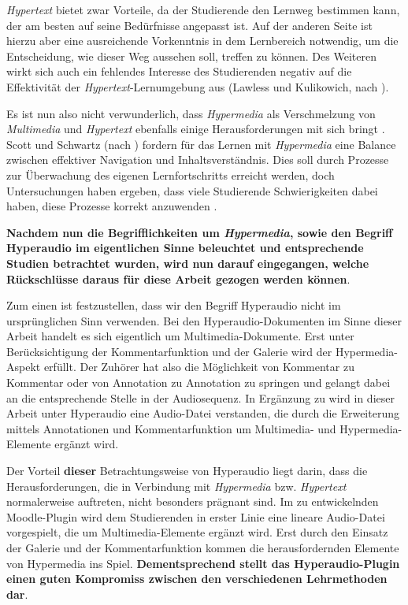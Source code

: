 \textit{Hypertext} bietet zwar Vorteile, da der Studierende den Lernweg bestimmen kann, der am besten auf seine Bedürfnisse angepasst ist. Auf der anderen Seite ist hierzu aber eine ausreichende Vorkenntnis in dem Lernbereich notwendig, um die Entscheidung, wie dieser Weg aussehen soll, treffen zu können. Des Weiteren wirkt sich auch ein fehlendes Interesse des Studierenden negativ auf die Effektivität der \textit{Hypertext}-Lernumgebung aus (Lawless und Kulikowich, nach \cite{moos2010multimedia}).

Es ist nun also nicht verwunderlich, dass \textit{Hypermedia} als Verschmelzung von \textit{Multimedia} und \textit{Hypertext} ebenfalls einige Herausforderungen mit sich bringt \citep{moos2010multimedia}. Scott und Schwartz (nach \cite{moos2010multimedia}) fordern für das Lernen mit \textit{Hypermedia} eine Balance zwischen effektiver Navigation und Inhaltsverständnis. Dies soll durch Prozesse zur Überwachung des eigenen Lernfortschritts erreicht werden, doch Untersuchungen haben ergeben, dass viele Studierende Schwierigkeiten dabei haben, diese Prozesse korrekt anzuwenden \citep{moos2010multimedia}.

\label{sec:audiocues}

\textbf{Nachdem nun die Begrifflichkeiten um \textit{Hypermedia}, sowie den Begriff Hyperaudio im eigentlichen Sinne beleuchtet und entsprechende Studien betrachtet wurden, wird nun darauf eingegangen, welche Rückschlüsse daraus für diese Arbeit gezogen werden können}.

Zum einen ist festzustellen, dass wir den Begriff Hyperaudio nicht im ursprünglichen Sinn verwenden. Bei den Hyperaudio-Dokumenten im Sinne dieser Arbeit handelt es sich eigentlich um Multimedia-Dokumente. Erst unter Berücksichtigung der Kommentarfunktion und der Galerie wird der Hypermedia-Aspekt erfüllt. Der Zuhörer hat also die Möglichkeit von Kommentar zu Kommentar oder von Annotation zu Annotation zu springen und gelangt dabei an die entsprechende Stelle in der Audiosequenz. In Ergänzung zu \cite{zumbach2006learning} wird in dieser Arbeit unter Hyperaudio eine Audio-Datei verstanden, die durch die Erweiterung mittels Annotationen und Kommentarfunktion um Multimedia- und Hypermedia-Elemente ergänzt wird.

Der Vorteil \textbf{dieser} Betrachtungsweise von Hyperaudio liegt darin, dass die Herausforderungen, die in Verbindung mit \textit{Hypermedia} bzw. \textit{Hypertext} normalerweise auftreten, nicht besonders prägnant sind. Im zu entwickelnden Moodle-Plugin wird dem Studierenden in erster Linie eine lineare Audio-Datei vorgespielt, die um Multimedia-Elemente ergänzt wird. Erst durch den Einsatz der Galerie und der Kommentarfunktion kommen die herausfordernden Elemente von Hypermedia ins Spiel. \textbf{Dementsprechend stellt das Hyperaudio-Plugin einen guten Kompromiss zwischen den verschiedenen Lehrmethoden dar}.


